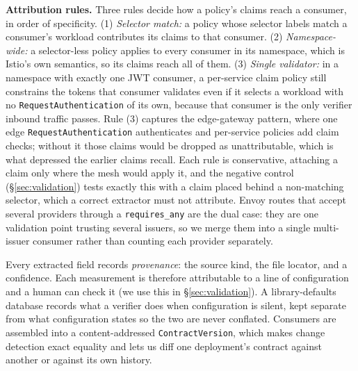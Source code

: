 \noindent\textbf{Attribution rules.} Three rules decide how a policy's claims reach a
consumer, in order of specificity. (1) \emph{Selector match:} a policy whose selector
labels match a consumer's workload contributes its claims to that consumer. (2)
\emph{Namespace-wide:} a selector-less policy applies to every consumer in its
namespace, which is Istio's own semantics, so its claims reach all of them. (3)
\emph{Single validator:} in a namespace with exactly one JWT consumer, a per-service
claim policy still constrains the tokens that consumer validates even if it selects a
workload with no \texttt{RequestAuthentication} of its own, because that consumer is
the only verifier inbound traffic passes. Rule (3) captures the edge-gateway pattern,
where one edge \texttt{RequestAuthentication} authenticates and per-service policies
add claim checks; without it those claims would be dropped as unattributable, which
is what depressed the earlier claims recall. Each rule is conservative, attaching a
claim only where the mesh would apply it, and the negative control
(\S\ref{sec:validation}) tests exactly this with a claim placed behind a non-matching
selector, which a correct extractor must not attribute. Envoy routes that accept
several providers through a \texttt{requires\_any} are the dual case: they are one
validation point trusting several issuers, so we merge them into a single
multi-issuer consumer rather than counting each provider separately.

Every extracted field records \emph{provenance}: the source kind, the file
locator, and a confidence. Each measurement is therefore attributable to a line of
configuration and a human can check it (we use this in \S\ref{sec:validation}).
A library-defaults database records what a verifier does when configuration is
silent, kept separate from what configuration states so the two are never conflated.
Consumers are assembled into a content-addressed \texttt{ContractVersion}, which
makes change detection exact equality and lets us diff one deployment's contract
against another or against its own history.

